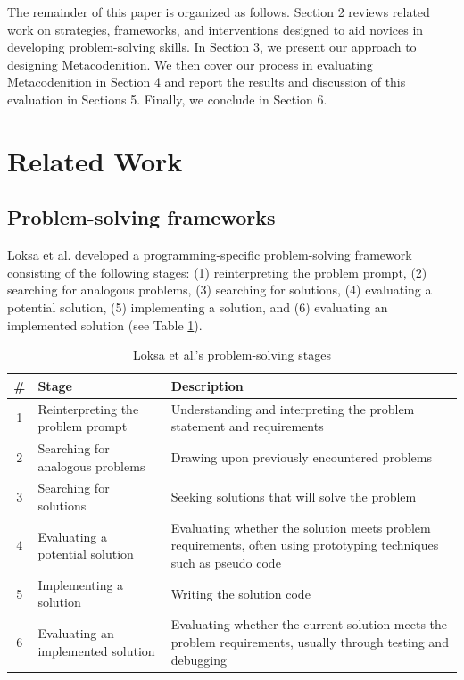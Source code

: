 \documentclass[sigconf,authorversion,nonacm]{acmart}
\begin{document}
The remainder of this paper is organized as follows. Section 2 reviews related work on strategies, frameworks, and interventions designed to aid novices in developing problem-solving skills. In Section 3, we present our approach to designing Metacodenition. We then cover our process in evaluating Metacodenition in Section 4 and report the results and discussion of this evaluation in Sections 5. Finally, we conclude in Section 6.

\section{Related Work}

\subsection{Problem-solving frameworks}
Loksa et al. \cite{loksa20162} developed a programming-specific problem-solving framework consisting of the following stages: (1) reinterpreting the problem prompt, (2) searching for analogous problems, (3) searching for solutions, (4) evaluating a potential solution, (5) implementing a solution, and (6) evaluating an implemented solution (see Table \ref{tab:loksaFramework}). 

\begin{table}
  \caption{Loksa et al.'s problem-solving stages}
  \label{tab:loksaFramework}
  \begin{tabular}{c|p{35mm}|p{35mm}}
    \toprule
    \#&Stage&Description\\
    \midrule
    1&Reinterpreting the problem prompt&Understanding and interpreting the problem statement and requirements\\
    \midrule
    2&Searching for analogous problems&Drawing upon previously encountered problems \\
    \midrule
    3&Searching for solutions&Seeking solutions that will solve the problem\\
    \midrule
    4&Evaluating a potential solution&Evaluating whether the solution meets problem requirements, often using prototyping techniques such as pseudo code\\
    \midrule
    5&Implementing a solution&Writing the solution code \\
    \midrule
    6&Evaluating an implemented solution&Evaluating whether the current solution meets the problem requirements, usually through testing and debugging\\
    \bottomrule
  \end{tabular}
\end{table}
\end{document}
